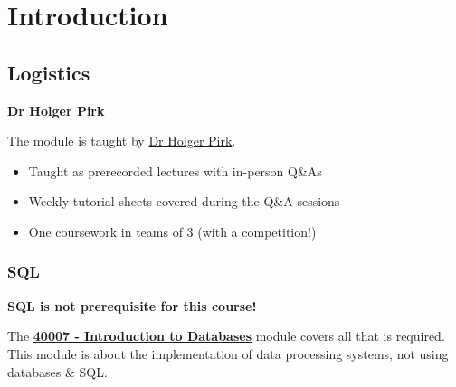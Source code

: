 \chapter{Introduction}
\section{Logistics}
\begin{minipage}{.3\textwidth}
    \begin{center}
        \centerline{\textbf{Dr Holger Pirk}}
    \end{center}
\end{minipage} \hfill \begin{minipage}{.65\textwidth}
    The module is taught by \href{https://holger.pirk.name/}{Dr Holger Pirk}.
    \begin{itemize}
        \item Taught as prerecorded lectures with in-person Q\&As
        \item Weekly tutorial sheets covered during the Q\&A sessions
        \item One coursework in teams of 3 (with a competition!)
    \end{itemize}
\end{minipage}
\subsection{SQL}
\begin{center}
    \textbf{SQL is not prerequisite for this course!}
\end{center}
The \href{https://www.doc.ic.ac.uk/~pjm/idb/}{\textbf{40007 - Introduction to Databases}} module covers all that is required. This module is about the implementation of data processing systems, not using databases \& SQL.


